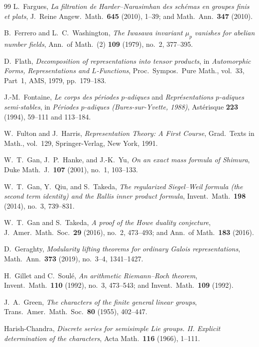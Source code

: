 \begin{thebibliography}{99}
L.~Fargues,
\emph{La filtration de Harder--Narasimhan des sch\'emas en groupes finis et plats},
J.\ Reine Angew.\ Math.\ \textbf{645} (2010), 1--39; and Math.\ Ann.\ \textbf{347} (2010).

B.~Ferrero and L.~C.~Washington,
\emph{The Iwasawa invariant $\mu_p$ vanishes for abelian number fields},
Ann.\ of Math.\ (2) \textbf{109} (1979), no.~2, 377--395.

D.~Flath,
\emph{Decomposition of representations into tensor products},
in \emph{Automorphic Forms, Representations and $L$-Functions}, Proc.\ Sympos.\ Pure Math., vol.~33, Part~1, AMS, 1979, pp.~179--183.

J.-M.~Fontaine,
\emph{Le corps des p\'eriodes $p$-adiques} and \emph{Repr\'esentations $p$-adiques semi-stables},
in \emph{P\'eriodes $p$-adiques (Bures-sur-Yvette, 1988)}, Ast\'erisque \textbf{223} (1994), 59--111 and 113--184.

W.~Fulton and J.~Harris,
\emph{Representation Theory: A First Course},
Grad.\ Texts in Math., vol.~129, Springer-Verlag, New York, 1991.

W.~T.~Gan, J.~P.~Hanke, and J.-K.~Yu,
\emph{On an exact mass formula of Shimura},
Duke Math.\ J.\ \textbf{107} (2001), no.~1, 103--133.

W.~T.~Gan, Y.~Qiu, and S.~Takeda,
\emph{The regularized Siegel--Weil formula (the second term identity) and the Rallis inner product formula},
Invent.\ Math.\ \textbf{198} (2014), no.~3, 739--831.

W.~T.~Gan and S.~Takeda,
\emph{A proof of the Howe duality conjecture},
J.\ Amer.\ Math.\ Soc.\ \textbf{29} (2016), no.~2, 473--493; and Ann.\ of Math.\ \textbf{183} (2016).

D.~Geraghty,
\emph{Modularity lifting theorems for ordinary Galois representations},
Math.\ Ann.\ \textbf{373} (2019), no.~3--4, 1341--1427.

H.~Gillet and C.~Soul\'e,
\emph{An arithmetic Riemann--Roch theorem},
Invent.\ Math.\ \textbf{110} (1992), no.~3, 473--543; and Invent.\ Math.\ \textbf{109} (1992).

J.~A.~Green,
\emph{The characters of the finite general linear groups},
Trans.\ Amer.\ Math.\ Soc.\ \textbf{80} (1955), 402--447.

Harish-Chandra,
\emph{Discrete series for semisimple Lie groups. II. Explicit determination of the characters},
Acta Math.\ \textbf{116} (1966), 1--111.


\end{thebibliography}
